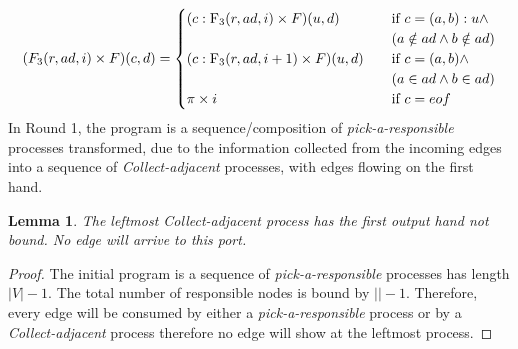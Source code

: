 \documentclass{article}                     \usepackage{graphics}
\newtheorem{lemma}{Lemma}
\begin{document}
\[(F_3(r,ad,i) \times F) (c,d) =
  \begin{cases}
   (c:\text F_3(r,ad,i)  \times F)(u,d)& \quad \text{if } c = (a,b): u\land \\ 
                                                 &\quad ( a \notin ad \land b \notin ad) \\
    (c:\text F_3(r,ad,i +1)  \times F) (u,d) & \quad \text{if } c = (a,b) \land  \\
                                                         & \quad( a \in ad \land b \in ad) \\
 \pi \times i & \quad \text{if }   c= eof\\
  \end{cases}
\]
In Round 1, the program is a sequence/composition  of  \textit{pick-a-responsible} processes transformed, due to the information collected from the incoming edges   into  a sequence of   \textit{Collect-adjacent} processes, with edges flowing on the first hand. 



\begin{lemma}  The leftmost  \textit{Collect-adjacent} process has the first output hand not bound. No edge will arrive to this port.
\end{lemma} 
\begin{proof}
The initial program is a sequence   of  \textit{pick-a-responsible} processes  has length $|V|-1$.  The total number of responsible nodes is bound by  $||-1$. Therefore, every edge will be consumed by either a \textit{pick-a-responsible} process  or by a \textit{Collect-adjacent} process  therefore no edge will show at the leftmost process. 

\end{proof}
\end{document}
